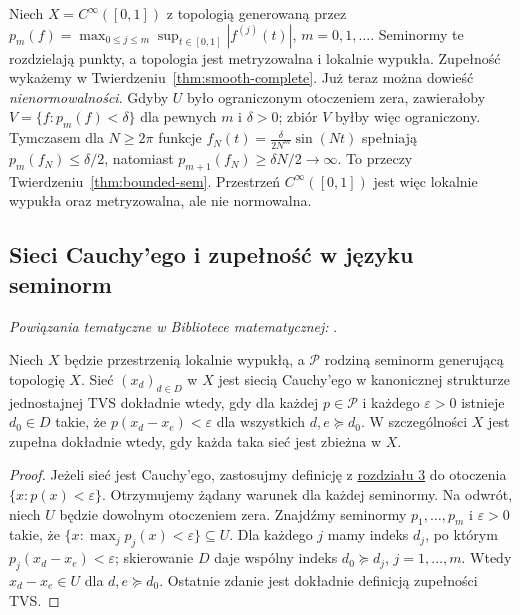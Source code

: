 \begin{przyklad}
\label{ex:smooth-frechet-preview}
Niech $X=C^\infty([0,1])$ z topologią generowaną przez
$p_m(f)=\max_{0\le j\le m}\sup_{t\in[0,1]}|f^{(j)}(t)|$,
$m=0,1,\ldots$. Seminormy te rozdzielają punkty,
a topologia jest metryzowalna i lokalnie wypukła.
Zupełność wykażemy w Twierdzeniu~\ref{thm:smooth-complete}. Już teraz
można dowieść \emph{nienormowalności}. Gdyby $U$ było ograniczonym
otoczeniem zera, zawierałoby
$V=\{f:p_m(f)<\delta\}$ dla pewnych $m$ i $\delta>0$;
zbiór $V$ byłby więc ograniczony. Tymczasem dla
$N\ge2\pi$ funkcje
$f_N(t)=\frac{\delta}{2N^m}\sin(Nt)$
spełniają $p_m(f_N)\le\delta/2$, natomiast
$p_{m+1}(f_N)\ge\delta N/2\to\infty$.
To przeczy Twierdzeniu~\ref{thm:bounded-sem}.
Przestrzeń $C^\infty([0,1])$ jest więc lokalnie wypukła
oraz metryzowalna, ale nie normowalna.
\end{przyklad}


\subsection{Sieci Cauchy'ego i zupełność w języku seminorm}

\noindent\emph{Powiązania tematyczne w Bibliotece matematycznej:} .


\begin{twierdzenie}
\label{thm:lcs-cauchy}
Niech $X$ będzie przestrzenią lokalnie wypukłą, a
$\mathcal P$ rodziną seminorm generującą topologię $X$.
Sieć $(x_d)_{d\in D}$ w $X$ jest siecią Cauchy'ego
w kanonicznej strukturze jednostajnej TVS dokładnie wtedy,
gdy dla każdej $p\in\mathcal P$ i każdego $\varepsilon>0$
istnieje $d_0\in D$ takie, że $p(x_d-x_e)<\varepsilon$
dla wszystkich $d,e\succeq d_0$.
W szczególności $X$ jest zupełna dokładnie wtedy, gdy każda
taka sieć jest zbieżna w $X$.
\end{twierdzenie}
\begin{proof}
Jeżeli sieć jest Cauchy'ego, zastosujmy definicję z
\hyperref[sec:zupelnosc]{rozdziału 3} do otoczenia $\{x:p(x)<\varepsilon\}$.
Otrzymujemy żądany warunek dla każdej seminormy.
Na odwrót, niech $U$ będzie dowolnym otoczeniem zera.
Znajdźmy seminormy $p_1,\ldots,p_m$ i $\varepsilon>0$
takie, że $\{x:\max_jp_j(x)<\varepsilon\}\subseteq U$.
Dla każdego $j$ mamy indeks $d_j$, po którym
$p_j(x_d-x_e)<\varepsilon$; skierowanie $D$ daje wspólny
indeks $d_0\succeq d_j$, $j=1,\ldots,m$.
Wtedy $x_d-x_e\in U$ dla $d,e\succeq d_0$.
Ostatnie zdanie jest dokładnie definicją zupełności TVS.
\end{proof}

